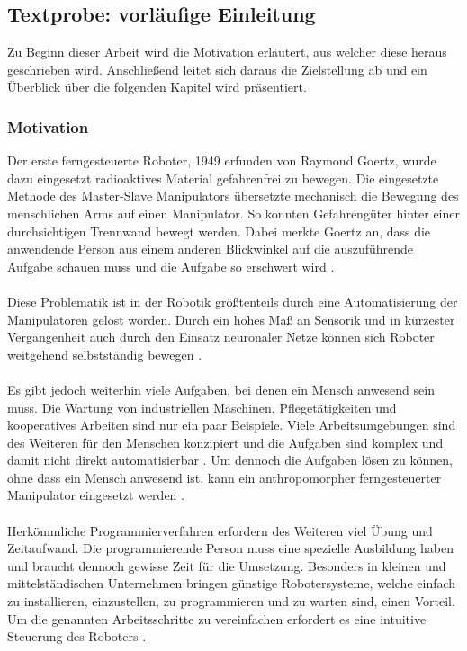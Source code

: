 \subsection{Textprobe: vorläufige Einleitung}
  Zu Beginn dieser Arbeit wird die Motivation erläutert, aus welcher diese heraus geschrieben wird. Anschließend leitet sich daraus die Zielstellung ab und ein Überblick über die folgenden Kapitel wird präsentiert.
\subsubsection{Motivation}%
  Der erste ferngesteuerte Roboter, 1949 erfunden von Raymond Goertz, wurde dazu eingesetzt radioaktives Material gefahrenfrei zu bewegen. Die eingesetzte Methode des Master-Slave Manipulators übersetzte mechanisch die Bewegung des menschlichen Arms auf einen Manipulator. So konnten Gefahrengüter hinter einer durchsichtigen Trennwand bewegt werden. Dabei merkte Goertz an, dass die anwendende Person aus einem anderen Blickwinkel auf die auszuführende Aufgabe schauen muss und die Aufgabe so erschwert wird \cite{goertz_master-slave_1949}. \\\\
  Diese Problematik ist in der Robotik größtenteils durch eine Automatisierung der Manipulatoren gelöst worden. Durch ein hohes Maß an Sensorik und in kürzester Vergangenheit auch durch den Einsatz neuronaler Netze können sich Roboter weitgehend selbstständig bewegen \cite{siciliano_springer_2008}.\\\\
  Es gibt jedoch weiterhin viele Aufgaben, bei denen ein Mensch anwesend sein muss. Die Wartung von industriellen Maschinen, Pflegetätigkeiten und kooperatives Arbeiten sind nur ein paar Beispiele. Viele Arbeitsumgebungen sind des Weiteren für den Menschen konzipiert und die Aufgaben sind komplex und damit nicht direkt automatisierbar \cite{fritsche_first-person_2015}. Um dennoch die Aufgaben lösen zu können, ohne dass ein Mensch anwesend ist, kann ein anthropomorpher ferngesteuerter Manipulator eingesetzt werden \cite{tanie_mfi_2003}\cite{stanczyk_development_2006}.\\\\
  Herkömmliche Programmierverfahren erfordern des Weiteren viel Übung und Zeitaufwand. Die programmierende Person muss eine spezielle Ausbildung haben und braucht dennoch gewisse Zeit für die Umsetzung. Besonders in kleinen und mittelständischen Unternehmen bringen günstige Robotersysteme, welche einfach zu installieren, einzustellen, zu programmieren und zu warten sind, einen Vorteil. Um die genannten Arbeitsschritte zu vereinfachen erfordert es eine intuitive Steuerung des Roboters \cite[S.76]{brogardh_present_2007} \cite[S.190]{ehlers_echtzeitfahige_2019}. \\\\
